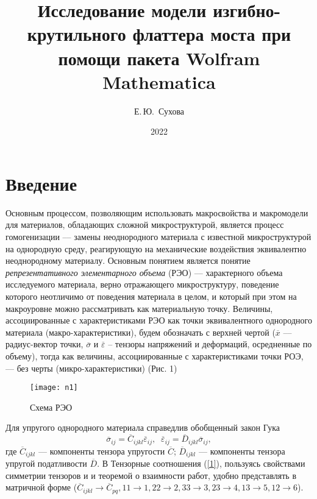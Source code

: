 \documentclass[12pt, a4paper]{article}
\title{Исследование модели изгибно-крутильного флаттера моста при 
	помощи пакета Wolfram Mathematica}
\author{Е.\,Ю.~Сухова}
\date{2022}
\begin{document}
	\tableofcontents
	\newpage
\section{Введение}

Основным процессом, позволяющим использовать макросвойства и макромодели для материалов, обладающих сложной микроструктурой, является процесс гомогенизации –-- замены неоднородного материала с известной микроструктурой на однородную среду, реагирующую на механические воздействия эквивалентно неоднородному материалу. Основным понятием является понятие \textit{репрезентативного элементарного объема} (РЭО) –-- характерного объема исследуемого материала, верно отражающего микроструктуру, поведение которого неотличимо от поведения материала в целом, и который при этом на макроуровне можно рассматривать как материальную точку. Величины, ассоциированные с характеристиками РЭО как точки эквивалентного однородного материала (макро-характеристики), будем обозначать с верхней чертой ($\overline{x}$ –-- радиус-вектор точки, $\overline{\sigma}$ и $\overline{\varepsilon}$ – тензоры напряжений и деформаций, осредненные по объему), тогда как величины, ассоциированные с характеристиками точки РОЭ, –-- без черты (микро-характеристики) (Рис. 1)
\begin{figure}[h]
	\begin{center}
		\texttt{[image: n1]}
	\end{center}
	\caption{Схема РЭО}
\end{figure}

Для упругого однородного материала справедлив обобщенный закон Гука
\begin{equation}\label{1}
\overline{\sigma}_{ij}=\overline{C}_{ijkl} \overline{\varepsilon}_{ij},\;\;\overline{\varepsilon}_{ij}=\overline{D}_{ijkl} \overline{\sigma}_{ij}, 
 \end{equation}
где $\overline{C}_{ijkl}$ --- компоненты тензора упругости $\overline{C}$; $\overline{D}_{ijkl}$ --- компоненты тензора упругой податливости $\overline{D}$. В Тензорные соотношения (\ref{1}), пользуясь свойствами симметрии тензоров  и  и теоремой о взаимности работ, удобно представлять в матричной форме ($\overline{C}_{ijkl}\rightarrow\overline{C}_{pq}, 11\rightarrow1, 22\rightarrow 2,33\rightarrow 3,23\rightarrow 4, 13\rightarrow 5, 12\rightarrow 6$).
\end{document}
